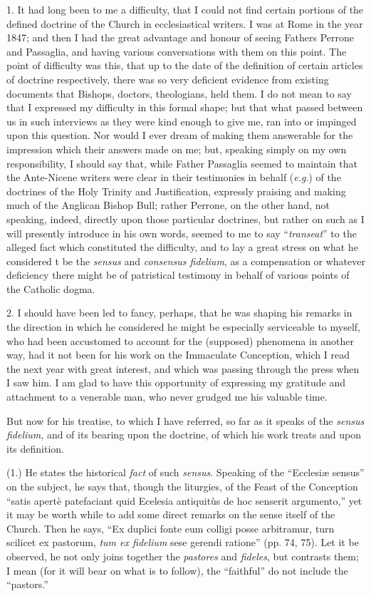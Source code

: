1. It had long been to me a difficulty, that I
could not find certain portions of the defined doctrine of the Church in
ecclesiastical writers. I was at Rome in the year 1847; and then I had
the great advantage and honour of seeing Fathers Perrone and Passaglia,
and having various conversations with them on this point. The point of
difficulty was this, that up to the date of the definition of certain
articles of doctrine respectively, there was so very deficient evidence
from existing documents that Bishops, doctors, theologians, held them. I
do not mean to say that I expressed my difficulty in this formal shape;
but that what passed between us in such interviews as they were kind
enough to give me, ran into or impinged upon this question. Nor would I
ever dream of making them answerable for the impression which their
answers made on me; but, speaking simply on my own responsibility, I
should say that, while Father Passaglia seemed to maintain that the
Ante-Nicene writers were clear in their testimonies in behalf (\emph{e.g}.)
of the doctrines of the Holy Trinity and Justification, expressly
praising and making much of the Anglican Bishop Bull; rather Perrone, on
the other hand, not speaking, indeed, directly upon those particular
doctrines, but rather on such as I will presently introduce in his own
words, seemed to me to say ``\emph{transeat}'' to the alleged fact which
constituted the difficulty, and to lay a great stress on what he
considered t be the \emph{sensus} and \emph{consensus fidelium}, as a
compensation or whatever deficiency there might be of patristical
testimony in behalf of various points of the Catholic dogma.

2. I should have been led to fancy, perhaps, that
he was shaping his remarks in the direction in which he considered he
might be especially serviceable to myself, who had been accustomed to
account for the (supposed) phenomena in another way, had it not been for
his work on the Immaculate Conception, which I read the next year with
great interest, and which was passing through the press when I saw him.
I am glad to have this opportunity of expressing my gratitude and
attachment to a venerable man, who never grudged me his valuable time.

But now for his treatise, to which I have referred,
so far as it speaks of the \emph{sensus fidelium}, and of its bearing
upon the doctrine, of which his work treats and upon its definition.

(1.) He states the historical \emph{fact} of such \emph{sensus}.
Speaking of the ``Ecclesiæ sensus'' on the subject, he says that, though
the liturgies, of the Feast of the Conception ``satis apertè patefaciant
quid Ecelesia antiquitùs de hoc senserit argumento,'' yet it may be
worth while to add some direct remarks on the sense itself of the
Church. Then he says, ``Ex duplici fonte eum colligi posse arbitramur,
turn scilicet ex pastorum, \emph{tum ex fidelium} sese gerendi ratione''
(pp. 74, 75). Let it be observed, he not only joins together the \emph{pastores}
and \emph{fideles}, but contrasts them; I mean (for it will bear on what
is to follow), the ``faithful'' do not include the ``pastors.''

